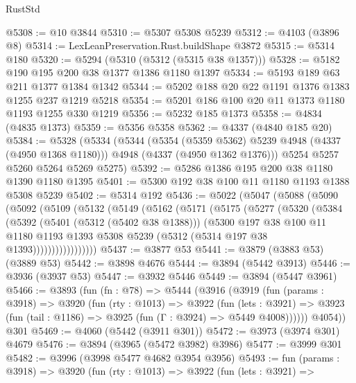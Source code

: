 \begin{lexlean}{RustStd}
\begin{coremodule}
@5308 := @10 @3844
@5310 := @5307 @5308 @5239
@5312 := @4103 (@3896 @8)
@5314 := LexLeanPreservation.Rust.buildShape @3872
@5315 := @5314 @180
@5320 := @5294 (@5310 (@5312 (@5315 @38 @1357)))
@5328 := @5182 @190 @195 @200 @38 @1377 @1386 @1180 @1397
@5334 := @5193 @189 @63 @211 @1377 @1384 @1342
@5344 := @5202 @188 @20 @22 @1191 @1376 @1383 @1255 @237 @1219 @5218
@5354 := @5201 @186 @100 @20 @11 @1373 @1180 @1193 @1255 @330 @1219
@5356 := @5232 @185 @1373
@5358 := @4834 (@4835 @1373)
@5359 := @5356 @5358
@5362 := @4337 (@4840 @185 @20)
@5384 := @5328
    (@5334
      (@5344
        (@5354 (@5359 @5362) @5239 @4948 (@4337 (@4950 @1368 @1180)))
        @4948
        (@4337 (@4950 @1362 @1376)))
      @5254
      @5257
      @5260
      @5264
      @5269
      @5275)
@5392 := @5286 @1386 @195 @200 @38 @1180 @1390 @1180 @1395
@5401 := @5300 @192 @38 @100 @11 @1180 @1193 @1388 @5308 @5239
@5402 := @5314 @192
@5436 := @5022
    (@5047
      (@5088
        (@5090
          (@5092
            (@5109
              (@5132
                (@5149
                  (@5162
                    (@5171
                      (@5175
                        (@5277
                          (@5320
                            (@5384
                              (@5392
                                (@5401 (@5312 (@5402 @38 @1388)))
                                (@5300
                                  @197
                                  @38
                                  @100
                                  @11
                                  @1180
                                  @1193
                                  @1393
                                  @5308
                                  @5239
                                  (@5312 (@5314 @197 @38 @1393)))))))))))))))))
@5437 := @3877 @53
@5441 := @3879 (@3883 @53) (@3889 @53)
@5442 := @3898 @4676
@5444 := @3894 (@5442 @3913)
@5446 := @3936 (@3937 @53)
@5447 := @3932 @5446
@5449 := @3894 (@5447 @3961)
@5466 := @3893
    (fun (fn : @78) =>
    @5444
      (@3916
        (@3919
          (fun (params : @3918) =>
          @3920
            (fun (rty : @1013) =>
            @3922
              (fun (lets : @3921) =>
              @3923 (fun (tail : @1186) => @3925 (fun (Γ : @3924) => @5449 @4008))))))
        @4054))
    @301
@5469 := @4060 (@5442 (@3911 @301))
@5472 := @3973 (@3974 @301) @4679
@5476 := @3894 (@3965 (@5472 @3982) @3986)
@5477 := @3999 @301
@5482 := @3996 (@3998 @5477 @4682 @3954 @3956)
@5493 := fun (params : @3918) =>
  @3920
    (fun (rty : @1013) =>
    @3922
      (fun (lets : @3921) =>

\end{coremodule}
\end{lexlean}
